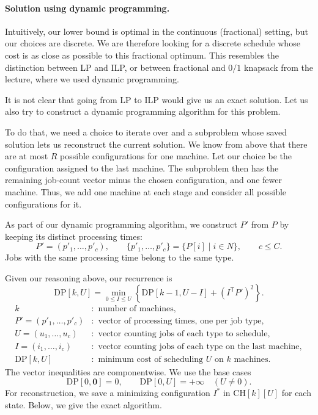 \documentclass[12pt,a4paper]{article}
\theoremstyle{definition}
\theoremstyle{plain}
\begin{document}
\paragraph{Solution using dynamic programming.}
Intuitively, our lower bound is optimal in the continuous (fractional)
setting, but our choices are discrete. We are therefore looking for a
discrete schedule whose cost is as close as possible to this fractional
optimum. This resembles the distinction between LP and ILP, or between
fractional and $0/1$ knapsack from the lecture, where we used dynamic
programming.

It is not clear that going from LP to ILP would give us an exact solution.
Let us also try to construct a dynamic programming algorithm for this problem.

To do that, we need a choice to iterate over and a subproblem whose saved
solution lets us reconstruct the current solution. We know from above that
there are at most $R$ possible configurations for one machine. Let our
choice be the configuration assigned to the last machine. The subproblem
then has the remaining job-count vector minus the chosen configuration,
and one fewer machine. Thus, we add one machine at each stage and consider
all possible configurations for it.

As part of our dynamic programming algorithm, we construct $P'$ from $P$
by keeping its distinct processing times:
\[
P'=(p'_1,\ldots,p'_c),\qquad
\{p'_1,\ldots,p'_c\}=\{P[i]\mid i\in N\},\qquad c\leq C.
\]
Jobs with the same processing time belong to the same type.

Given our reasoning above, our recurrence is
\[
\mathrm{DP}[k,U]
=\min_{0\leq I\leq U}
\left\{
\mathrm{DP}[k-1,U-I]
+(I^{\mathsf T}P')^2
\right\}.
\]
\[
\begin{aligned}
k &:\text{ number of machines},\\
P'=(p'_1,\ldots,p'_c) &:\text{ vector of processing times, one per job type},\\
U=(u_1,\ldots,u_c) &:\text{ vector counting jobs of each type to schedule},\\
I=(i_1,\ldots,i_c) &:\text{ vector counting jobs of each type on the last machine},\\
\mathrm{DP}[k,U] &:\text{ minimum cost of scheduling }U
\text{ on }k\text{ machines}.
\end{aligned}
\]
The vector inequalities are componentwise. We use the base cases
\[
\mathrm{DP}[0,\mathbf{0}]=0,\qquad
\mathrm{DP}[0,U]=+\infty\quad(U\neq0).
\]
For reconstruction, we save a minimizing configuration $I^*$ in
$\mathrm{CH}[k][U]$ for each state.
Below, we give the exact algorithm.
\end{document}
